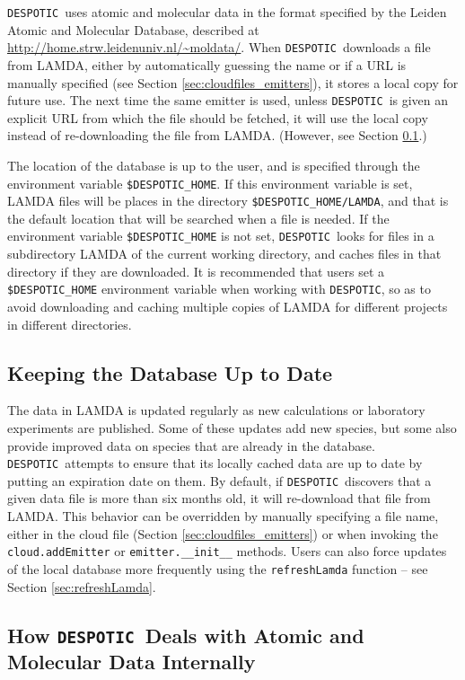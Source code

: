 \documentclass[12pt]{article}
\newcommand{\despotic}{\texttt{DESPOTIC}}
\begin{document}
\despotic\ uses atomic and molecular data in the format specified by the Leiden Atomic and Molecular Database, described at \url{http://home.strw.leidenuniv.nl/~moldata/}. When \despotic\ downloads a file from LAMDA, either by automatically guessing the name or if a URL is manually specified (see Section \ref{sec:cloudfiles_emitters}), it stores a local copy for future use. The next time the same emitter is used, unless \despotic\ is given an explicit URL from which the file should be fetched, it will use the local copy instead of re-downloading the file from LAMDA. (However, see Section \ref{sec:database_updates}.)

The location of the database is up to the user, and is specified through the environment variable \verb=$DESPOTIC_HOME=. If this environment variable is set, LAMDA files will be places in the directory \verb=$DESPOTIC_HOME/LAMDA=, and that is the default location that will be searched when a file is needed. If the environment variable \verb=$DESPOTIC_HOME= is not set, \despotic\ looks for files in a subdirectory LAMDA of the current working directory, and caches files in that directory if they are downloaded. It is recommended that users set a \verb=$DESPOTIC_HOME= environment variable when working with \despotic, so as to avoid downloading and caching multiple copies of LAMDA for different projects in different directories.


\subsection{Keeping the Database Up to Date}
\label{sec:database_updates}

The data in LAMDA is updated regularly as new calculations or laboratory experiments are published. Some of these updates add new species, but some also provide improved data on species that are already in the database.  \despotic\ attempts to ensure that its locally cached data are up to date by putting an expiration date on them. By default, if \despotic\ discovers that a given data file is more than six months old, it will re-download that file from LAMDA. This behavior can be overridden by manually specifying a file name, either in the cloud file (Section \ref{sec:cloudfiles_emitters}) or when invoking the \verb=cloud.addEmitter= or \verb=emitter.__init__= methods. Users can also force updates of the local database more frequently using the \verb=refreshLamda= function -- see Section \ref{sec:refreshLamda}.


\subsection{How \despotic\ Deals with Atomic and Molecular Data Internally}
\end{document}
